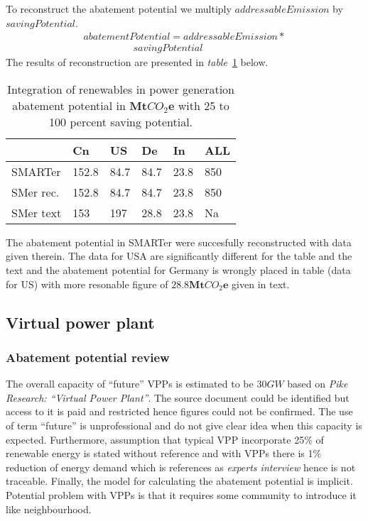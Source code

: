 \documentclass[11pt, twocolumn]{article}
\begin{document}
To reconstruct the abatement potential we multiply $addressableEmission$ by $savingPotential$.
\begin{gather*}
  abatementPotential = addressableEmission *\\
  \quad\quad\quad\quad\quad savingPotential
\end{gather*}
The results of reconstruction are presented in \emph{table}~\ref{tab:irpg} below.
\begin{center}
  \begin{table}[h]
    \begin{tabular}{ p{} | p{} | p{} | p{} | p{} | p{} }
       & Cn & US & De & In & ALL \\
      \hline
      SMARTer & 152.8 & 84.7 & 84.7 & 23.8 & 850 \\
      SMer rec. & 152.8 & 84.7 & 84.7 & 23.8 & 850 \\
      SMer text & 153 & 197 & 28.8 & 23.8 & Na
    \end{tabular}
    \caption{Integration of renewables in power generation abatement potential in $\mathbf{Mt}CO_2\mathbf{e}$ with 25 to 100 percent saving potential. \label{tab:irpg}}
  \end{table}
\end{center}
The abatement potential in SMARTer were succesfully reconstructed with data given therein. The data for USA are significantly different for the table and the text and the abatement potential for Germany is wrongly placed in table (data for US) with more resonable figure of $\mathbf{28.8Mt}CO_2\mathbf{e}$ given in text.











\subsection{Virtual power plant}
\subsubsection{Abatement potential review}
The overall capacity of ``future'' VPPs is estimated to be $30GW$ based on \emph{Pike Research: ``Virtual Power Plant''}. The source document could be identified but access to it is paid and restricted hence figures could not be confirmed. The use of term ``future'' is unprofessional and do not give clear idea when this capacity is expected. Furthermore, assumption that typical VPP incorporate 25\% of renewable energy is stated without reference and with VPPs there is 1\% reduction of energy demand which is references as \emph{experts interview} hence is not traceable. Finally, the model for calculating the abatement potential is implicit.\\
Potential problem with VPPs is that it requires some community to introduce it like neighbourhood.\\
\end{document}
